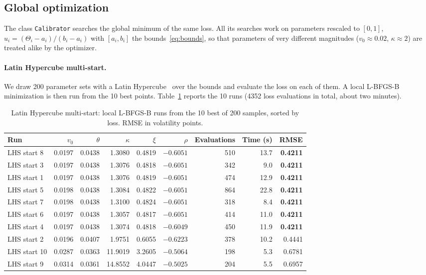 \documentclass[11pt,a4paper]{article}
\theoremstyle{plain}
\theoremstyle{definition}
\begin{document}
\subsection{Global optimization}
\label{sec:global}
The class \texttt{Calibrator} searches the global minimum of the same loss. All its searches work on parameters rescaled to $[0,1]$, $u_i=(\Theta_i-a_i)/(b_i-a_i)$ with $[a_i,b_i]$ the bounds~\eqref{eq:bounds}, so that parameters of very different magnitudes ($v_0\approx0.02$, $\kappa\approx2$) are treated alike by the optimizer.

\paragraph{Latin Hypercube multi-start.} We draw 200 parameter sets with a Latin Hypercube~\cite{mckay} over the bounds and evaluate the loss on each of them. A local L-BFGS-B minimization is then run from the 10 best points. Table~\ref{tab:lhs} reports the 10 runs (4352 loss evaluations in total, about two minutes).

\begin{table}[htbp]
\centering
\small
\begin{tabular}{@{}lrrrrrrrr@{}}
\toprule
Run & $v_0$ & $\theta$ & $\kappa$ & $\xi$ & $\rho$ & Evaluations & Time (s) & RMSE \\
\midrule
LHS start 8  & 0.0197 & 0.0438 & 1.3080  & 0.4819 & $-0.6051$ & 510 & 13.7 & \textbf{0.4211} \\
LHS start 3  & 0.0197 & 0.0438 & 1.3076  & 0.4818 & $-0.6051$ & 342 & 9.0  & \textbf{0.4211} \\
LHS start 1  & 0.0197 & 0.0438 & 1.3076  & 0.4819 & $-0.6051$ & 474 & 12.9 & \textbf{0.4211} \\
LHS start 5  & 0.0198 & 0.0438 & 1.3084  & 0.4822 & $-0.6051$ & 864 & 22.8 & \textbf{0.4211} \\
LHS start 7  & 0.0198 & 0.0438 & 1.3100  & 0.4824 & $-0.6051$ & 318 & 8.4  & \textbf{0.4211} \\
LHS start 6  & 0.0197 & 0.0438 & 1.3057  & 0.4817 & $-0.6051$ & 414 & 11.0 & \textbf{0.4211} \\
LHS start 4  & 0.0197 & 0.0438 & 1.3074  & 0.4818 & $-0.6049$ & 450 & 11.9 & \textbf{0.4211} \\
LHS start 2  & 0.0196 & 0.0407 & 1.9751  & 0.6055 & $-0.6223$ & 378 & 10.2 & 0.4441 \\
LHS start 10 & 0.0287 & 0.0363 & 11.9019 & 3.2605 & $-0.5064$ & 198 & 5.3  & 0.6781 \\
LHS start 9  & 0.0314 & 0.0361 & 14.8552 & 4.0447 & $-0.5025$ & 204 & 5.5  & 0.6957 \\
\bottomrule
\end{tabular}
\caption{Latin Hypercube multi-start: local L-BFGS-B runs from the 10 best of 200 samples, sorted by loss. RMSE in volatility points.}
\label{tab:lhs}
\end{table}
\end{document}
